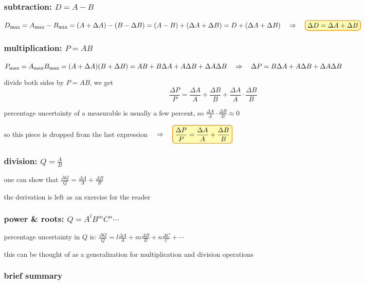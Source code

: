 \subsubsection*{subtraction: $D=A-B$}

$D_\tmax = A_\tmax - B_\tmin = (A + \Delta A) - (B - \Delta B) = (A-B) + (\Delta A + \Delta B)= D + (\Delta A + \Delta B) \RA \boxed{\Delta D = \Delta A + \Delta B}$

\subsubsection*{multiplication: $P=AB$}

$P_{\text{max}} = A_{\text{max}} B_{\text{max}} = (A + \Delta A)(B + \Delta B) = AB + B\Delta A + A\Delta B + \Delta A \Delta B \quad \Rightarrow \quad \Delta P =  B\Delta A + A\Delta B + \Delta A \Delta B$

divide both sides by $P=AB$, we get
\begin{equation*}
\frac{\Delta P}{P} = \frac{\Delta A}{A} + \frac{\Delta B}{B} + \frac{\Delta A}{A}\cdot\frac{\Delta B}{B}
\end{equation*}

percentage uncertainty of a measurable is usually a few percent, so $\frac{\Delta A}{A}\cdot\frac{\Delta B}{B} \approx 0$

so this piece is dropped from the last expression $\RA \boxed{\frac{\Delta P}{P} = \frac{\Delta A}{A} + \frac{\Delta B}{B}}$

\subsubsection*{division: $Q=\frac{A}{B}$}

one can show that $\boxed{\frac{\Delta Q}{Q} = \frac{\Delta A}{A} + \frac{\Delta B}{B}}$

the derivation is left as an exercise for the reader

\subsubsection*{power \& roots: $Q=A^l B^m C^n\cdots$}

percentage uncertainty in $Q$ is: $\frac{\Delta Q}{Q} = l\frac{\Delta A}{A} + m\frac{\Delta B}{B} + n\frac{\Delta C}{C} +\cdots$

this can be thought of as a generalization for multiplication and division operations


\subsubsection*{brief summary}

